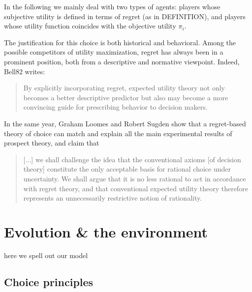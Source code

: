 \documentclass[fleqn,reqno,11pt]{article}
\begin{document}
In the following we mainly deal with two types of agents: players whose subjective utility is defined
in terms of regret (as in DEFINITION), and players whose utility
function coincides with the objective utility $\pi_i$. 

The justification for this choice is both historical and behavioral. Among
the possible competitors of utility maximization, regret has always been in a prominent
position, both from a descriptive and normative viewpoint. Indeed, Bell82 writes:
\begin{quote}
  By explicitly incorporating regret, expected utility theory not only becomes a better
  descriptive predictor but also may become a more convincing guide for prescribing behavior to
  decision makers.
\end{quote}
In the same year, Graham Loomes and Robert Sugden \citet{LoomesSugden1982:Regret-Theory:-} show that a regret-based theory of choice can match
and explain all the main experimental results of prospect theory, and claim that
\begin{quote} [...] we shall challenge the idea that the conventional axioms [of decision
  theory] constitute the only acceptable basis for rational choice under uncertainty. We shall
  argue that it is no less rational to act in accordance with regret theory, and that
  conventional expected utility theory therefore represents an unnecessarily restrictive notion
  of rationality. \hfill \citep{LoomesSugden1982:Regret-Theory:-}
\end{quote}









\section{Evolution \& the environment}

here we spell out our model

\subsection{Choice principles}
\end{document}
